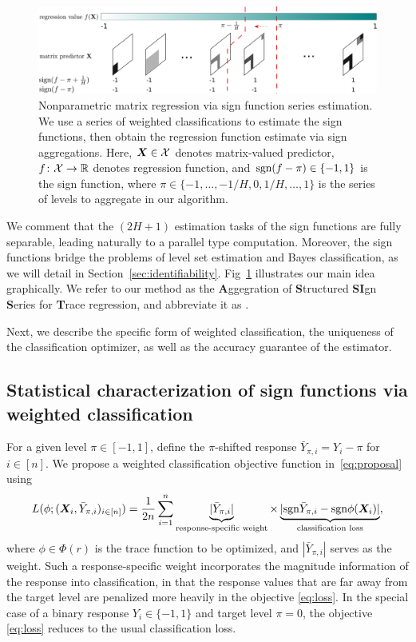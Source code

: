 \documentclass[aos]{imsart}
\theoremstyle{definition}
\newcommand*{\KeepStyleUnderBrace}[1]{%
\mathop{%
\mathchoice
{\underbrace{\displaystyle#1}}%
{\underbrace{\textstyle#1}}%
{\underbrace{\scriptstyle#1}}%
{\underbrace{\scriptscriptstyle#1}}%
}\limits
}
\def\sign{\textup{sgn}}
\def\NonparaM{\text{\bf \footnotesize ASSIST}}
\begin{document}
\begin{figure}[b]
\includegraphics[width=\textwidth]{figure/demo_method.pdf}
\caption{Nonparametric matrix regression via sign function series estimation. We use a series of weighted classifications to estimate the sign functions, then obtain the regression function estimate via sign aggregations. Here, $\bm X\in\mathcal{X}$ denotes matrix-valued predictor, $f\colon \mathcal{X}\to \mathbb{R}$ denotes regression function, and $\sign(f-\pi)\in\{-1,1\}$ is the sign function, where $\pi\in\{-1,\ldots,-1/H,0,1/H,\ldots, 1\}$ is the series of levels to aggregate in our algorithm.}
\label{fig:method}
\end{figure}

We comment that the $(2H+1)$ estimation tasks of the sign functions are fully separable, leading naturally to a parallel type computation. Moreover, the sign functions bridge the problems of level set estimation and Bayes classification, as we will detail in Section~\ref{sec:identifiability}. Fig~\ref{fig:method} illustrates our main idea graphically. We refer to our method as the {\bf \small A}ggegration of {\bf \small S}tructured {\bf \small SI}gn {\bf \small S}eries for {\bf \small T}race regression, and abbreviate it as \NonparaM.

Next, we describe the specific form of weighted classification, the uniqueness of the classification optimizer, as well as the accuracy guarantee of the estimator. 



\subsection{Statistical characterization of sign functions via weighted classification}

For a given level $\pi\in[-1,1]$, define the $\pi$-shifted response $\bar Y_{\pi,i} =Y_i-\pi$ for $i\in[n]$. We propose a weighted classification objective function in~\eqref{eq:proposal} using 
\begin{equation}\label{eq:loss}
L(\phi;(\mX_i,\bar Y_{\pi,i})_{i\in[n]})={1\over 2n}\sum_{i=1}^n\KeepStyleUnderBrace{|\bar Y_{\pi,i}|}_{\text{response-specific weight}}\times\KeepStyleUnderBrace{|\sign \bar Y_{\pi,i} - \sign \phi(\mX_i)|}_{\text{classification loss}},
\end{equation}
where $\phi\in \Phi(r)$ is the trace function to be optimized, and $|\bar Y_{\pi, i}|$ serves as the weight. Such a response-specific weight incorporates the magnitude information of the response into classification, in that the response values that are far away from the target level are penalized more heavily in the objective \eqref{eq:loss}. In the special case of a binary response $Y_i\in\{-1,1\}$ and target level $\pi=0$, the objective \eqref{eq:loss} reduces to the usual classification loss. 
\end{document}
